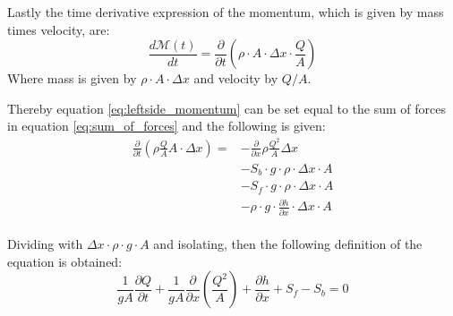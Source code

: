 Lastly the time derivative expression of the momentum, which is given by mass times velocity, are:
\begin{equation}\label{eq:leftside_momentum}
\frac{d \mathcal{M}(t)}{dt}=	\frac{\partial}{\partial t} \left(\rho \cdot A \cdot \Delta x \cdot \frac{Q}{A}\right)
\end{equation}
Where mass is given by $\rho \cdot A \cdot \Delta x$ and velocity by $Q / A$.

Thereby equation \ref{eq:leftside_momentum} can be set equal to the sum of forces in equation \ref{eq:sum_of_forces} and the following is given:
\begin{equation}
\begin{aligned}
\frac{\partial}{\partial t} (\rho \frac{Q}{A}A\cdot \Delta x) =& - \frac{\partial}{\partial x} \rho \frac{Q^2}{A}\Delta x \\
&-S_b \cdot g \cdot \rho \cdot \Delta x \cdot A \\
&-S_f \cdot g \cdot \rho \cdot \Delta x \cdot A \\ 
&-\rho\cdot g \cdot \frac{\partial h}{\partial x} \cdot \Delta x \cdot A 
\end{aligned}
\end{equation}
\\
Dividing with $\Delta x \cdot\rho \cdot g \cdot A$ and isolating, then the following definition of the equation is obtained:
\\
\begin{equation}
\boxed{\frac{1}{gA} \frac{\partial Q}{\partial t} +\frac{1}{gA}\frac{\partial}{\partial x} \left( \frac{Q^2}{A} \right) + \frac{\partial h}{\partial x} + S_f - S_b = 0}
\label{saintbernard_momentum}
\end{equation}
\\

